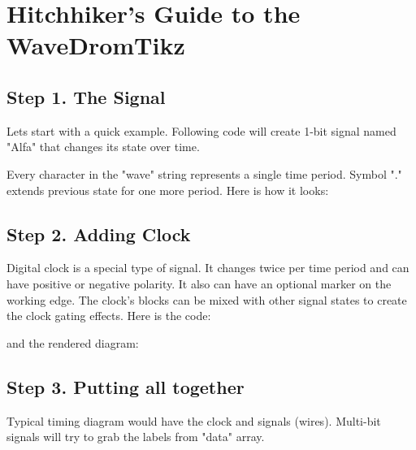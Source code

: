 \documentclass{article}
\begin{document}
\section{Hitchhiker's Guide to the WaveDromTikz}

\subsection{Step 1. The Signal}

Lets start with a quick example. Following code will create 1-bit signal named "Alfa" that changes its state over time.

Every character in the "wave" string represents a single time period. Symbol "." extends previous state for one more period. Here is how it looks: 

\begin{tikzpicture}[thick]
    
\end{tikzpicture}

\subsection{Step 2. Adding Clock}

Digital clock is a special type of signal. It changes twice per time period and can have positive or negative polarity. It also can have an optional marker on the working edge. The clock's blocks can be mixed with other signal states to create the clock gating effects. Here is the code: 



and the rendered diagram: 

\begin{tikzpicture}[thick]
    
\end{tikzpicture}


\subsection{Step 3. Putting all together}

Typical timing diagram would have the clock and signals (wires). Multi-bit signals will try to grab the labels from "data" array. 



\begin{tikzpicture}[thick]
    
\end{tikzpicture}
\end{document}
